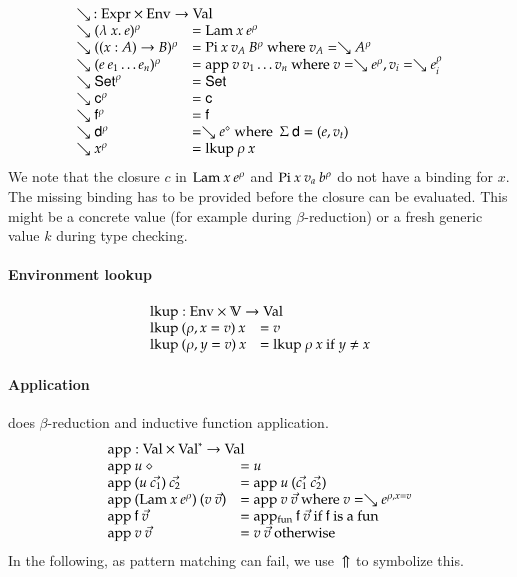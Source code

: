 \[
\begin{array}{ll}
\multicolumn{2}{l}{\wh \: : \Expr \times \Env \ra \Val}\\
\wh \clp{\lam{x}{e}}{\rho} & = \vlam \: x \: \cl{e}{\rho} \\
\wh \clp{\EPi{x}{A}{B}}{\rho} &= \vpi \: x \: v_A \: \cl{B}{\rho} \mbox{ where } v_A = \wh \cl{A}{\rho} \\
\wh \clp{e \: e_1 \ldots e_n}{\rho} &= \ap \: v \: v_1 \ldots v_n \mbox{ where } v = \wh \cl{e}{\rho} , v_i = \wh \cl{e_i}{\rho}\\
\wh \cl{\Set}{\rho} & = \Set \\ 
\wh \cl{\cc}{\rho} & = \cc  \\
\wh \cl{\ff}{\rho} & = \ff \\
\wh \cl{\dd}{\rho} & = \wh \cl{e}{\diamond} \mbox{ where } \: \Sig \: \dd = (e,v_t)\\
\wh \cl{x}{\rho} & = \lkup \: \rho \: x \\
\end{array}
\]
We note that the closure $c$  in $\mathrm{Lam} \: x \: e^{\rho}$
and $\mathrm{Pi} \: x \: v_a \: b^{\rho}$ do not have a binding for $x$.
The missing binding has to be provided before the closure can be evaluated.
This might be a concrete value (for example during $\beta$-reduction) or a
fresh generic value $k$ during type checking.

\paragraph*{Environment lookup}
\[
\begin{array}{ll}
\multicolumn{2}{l}{\lkup : \Env \times \cV \ra \Val }\\
\lkup \: (\ins{\rho}{x}{v}) \: x & = v \\
\lkup \: (\ins{\rho}{y}{v}) \: x & = \lkup \: \rho \: x \mbox{ if } y \neq x  
\end{array}
\]

\paragraph*{Application}
does $\beta$-reduction and inductive function application. 
\[
\begin{array}{ll}
\multicolumn{2}{l}{\ap : \Val \times \ves{\Val} \ra \Val}\\
\ap \: u \: \diamond & = u \\
\ap \: (u \: \vec{c_1}) \: \vec{c_2} & = \ap \: u \: (\vec{c_1}\:\vec{c_2})\\
\ap \: (\vlam \: x \: \cl{e}{\rho}) \: (v \: \vec{v}) & = \ap \: v \: \vec{v} \mbox{ where } v = \wh \cl{e}{\ins{\rho}{x}{v}} \\ 
\ap \: \ff \: \vec{v} & = \apf \: \ff \: \vec{v} \mbox{ if } \ff \mbox{ is a } \fun \\ 
\ap \: v \: \vec{v} & = v \: \vec{v} \mbox{ otherwise } \\
\end{array}
\]
In the following, as pattern matching can fail, we use $\:\Uparrow$ to symbolize this. 
